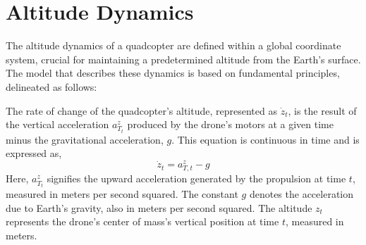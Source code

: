 \documentclass{article}
\begin{document}






\newpage
\section{Altitude Dynamics}
The altitude dynamics of a quadcopter are defined within a global coordinate system, crucial for maintaining a predetermined altitude from the Earth's surface. The model that describes these dynamics is based on fundamental principles, delineated as follows:

The rate of change of the quadcopter's altitude, represented as \( \dot{z}_t \), is the result of the vertical acceleration \( a^z_{T_t} \) produced by the drone's motors at a given time minus the gravitational acceleration, \( g \). This equation is continuous in time and is expressed as,
\begin{equation}
\dot{z}_t = a^z_{T,t} - g
\end{equation}
\noindent
Here, \( a^z_{T_t} \) signifies the upward acceleration generated by the propulsion at time \( t \), measured in meters per second squared. The constant \( g \) denotes the acceleration due to Earth's gravity, also in meters per second squared. The altitude \( z_t \) represents the drone's center of mass's vertical position at time \( t \), measured in meters.
\end{document}

